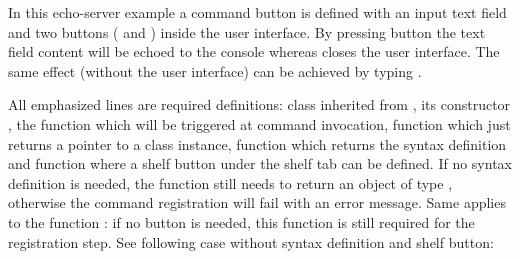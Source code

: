 \documentclass[letterpaper,10pt,english]{sphinxmanual}
\begin{document}
\begin{sphinxVerbatim}[commandchars=\\\{\}]
 
      
 
     
     
    
 
        
          
\end{sphinxVerbatim}

In this echo-server example a command button is defined with an input text field and two buttons ( and ) inside the user interface. By pressing button  the text field content will be echoed to the console whereas  closes the user interface. The same effect (without the user interface) can be achieved by typing .

All emphasized lines are required definitions: class  inherited from , its constructor , the function  which will be triggered at command invocation, function  which just returns a pointer to a class instance, function  which returns the syntax definition and function  where a shelf button under the shelf tab  can be defined. If no syntax definition is needed, the function  still needs to return an object of type , otherwise the command registration will fail with an error message. Same applies to the function : if no button is needed, this function is still required for the registration step. See following case without syntax definition and shelf button:
\end{document}
